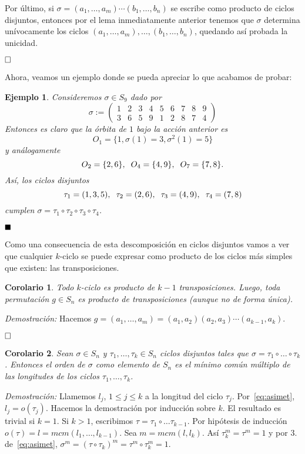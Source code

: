 \documentclass[12pt]{article}
\newtheorem{example}{Ejemplo}[theorem]
\newtheorem{corolario}{Corolario}[theorem]
\begin{document}
Por último, si $\sigma = (a_{1}, \ldots, a_{m}) \cdots(b_{1}, \ldots, b_{n})$ se escribe como producto de ciclos disjuntos, entonces por el lema inmediatamente anterior tenemos que $\sigma$ determina unívocamente los ciclos $(a_{1}, \ldots, a_{m}), \ldots, (b_{1}, \ldots, b_{n})$, quedando así probada la unicidad.

$\hfill \square$

Ahora, veamos un ejemplo donde se pueda apreciar lo que acabamos de probar:
\begin{example}\label{eq:excidis} Consideremos $\sigma \in S_{9}$ dado por $$\sigma:= \left(\begin{matrix}
1 &2 &3 &4 &5 &6 &7 &8 &9 \\
3 &6 &5 &9 &1 &2 &8 &7 &4
\end{matrix}
\right)$$ Entonces es claro que la órbita de $1$ bajo la acción anterior es $$O_{1} = \lbrace 1, \sigma(1)=3, \sigma^{2}(1) = 5 \rbrace$$ y análogamente $$O_{2} = \lbrace 2,6 \rbrace, \hspace{0.2cm} O_{4} = \lbrace 4,9 \rbrace, \hspace{0.2cm} O_{7} = \lbrace 7,8 \rbrace.$$ Así, los ciclos disjuntos $$\tau_{1} = (1,3,5), \hspace{0.2cm} \tau_{2} = (2,6), \hspace{0.2cm} \tau_{3} = (4,9), \hspace{0.2cm} \tau_{4} = (7,8)$$ cumplen $\sigma = \tau_{1} \circ \tau_{2} \circ \tau_{3} \circ \tau_{4}$.

$\hfill \blacksquare$
\end{example}

Como una consecuencia de esta descomposición en ciclos disjuntos vamos a ver que cualquier $k$-ciclo se puede expresar como producto de los ciclos más simples que existen: las transposiciones.

\begin{corolario} Todo $k$-ciclo es producto de $k-1$ transposiciones. Luego, toda permutación $g\in S_{n}$ es producto de transposiciones (aunque no de forma única).
\end{corolario}
\emph{Demostración: }
Hacemos $g = (a_{1}, \ldots, a_{m})=(a_{1},a_{2}) (a_{2},a_{3}) \cdots (a_{k-1},a_{k}).$

$\hfill \square$

\begin{corolario} 
Sean $\sigma \in S_{n}$ y $\tau_{1}, \ldots, \tau_{k} \in S_{n}$ ciclos disjuntos tales que $\sigma = \tau_{1} \circ \ldots \circ \tau_{k}$. Entonces el orden de $\sigma$ como elemento de $S_{n}$ es el mínimo común múltiplo de las longitudes de los ciclos $\tau_{1}, \ldots, \tau_{k}$.
\end{corolario} 
\emph{Demostración: } 
Llamemos $l_{j}$, $1 \leq j \leq k$ a la longitud del ciclo $\tau_{j}$. Por~\ref{eq:asimet}, $l_{j} = o(\tau_{j})$. Hacemos la demostración por inducción sobre $k$. El resultado es trivial si $k = 1$. Si $k > 1$, escribimos $\tau = \tau_{1} \circ \ldots \tau_{k-1}$. Por hipótesis de inducción $o(\tau)= l = mcm(l_{1}, \ldots, l_{k-1}).$ Sea $m = mcm(l,l_{k})$. Así $\tau_{k}^{m} = \tau^{m} = 1$ y por $3.$ de~\ref{eq:asimet}, $\sigma^{m} = (\tau \circ \tau_{k})^{m} = \tau^{m} \circ \tau_{k}^{m} = 1.$
 
\end{document}
